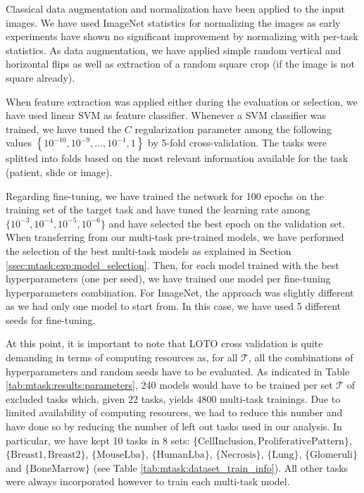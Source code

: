 Classical data augmentation and normalization have been applied to the input images. We have used ImageNet statistics for normalizing the images as early experiments have shown no significant improvement by normalizing with per-task statistics. As data augmentation, we have applied simple random vertical and horizontal flips as well as extraction of a random square crop (if the image is not square already).

When feature extraction was applied either during the evaluation or selection, we have used linear SVM \parencite{fan2008liblinear} as feature classifier. Whenever a SVM classifier was trained, we have tuned the $C$ regularization parameter among the following values $\left\{10^{-10}, 10^{-9},...,10^{-1},1\right\}$ by 5-fold cross-validation. The tasks were splitted into folds based on the most relevant information available for the task (patient, slide or image).

Regarding fine-tuning, we have trained the network for 100 epochs on the training set of the target task and have tuned the learning rate among $\{10^{-3}, 10^{-4}, 10^{-5}, 10^{-6}\}$ and have selected the best epoch on the validation set. When transferring from our multi-task pre-trained models, we have performed the selection of the best multi-task models as explained in Section \ref{ssec:mtask:exp:model_selection}. Then, for each model trained with the best hyperparameters (\ie one per seed), we have trained one model per fine-tuning hyperparameters combination. For ImageNet, the approach was slightly different as we had only one model to start from. In this case, we have used 5 different seeds for fine-tuning. 

At this point, it is important to note that LOTO cross validation is quite demanding in terms of computing resources as, for all $\mathcal{T}$, all the combinations of hyperparameters and random seeds have to be evaluated. As indicated in Table \ref{tab:mtask:results:parameters}, 240 models would have to be trained per set $\mathcal{T}$ of excluded tasks which, given 22 tasks, yields 4800 multi-task trainings. Due to limited availability of computing resources, we had to reduce this number and have done so by reducing the number of left out tasks used in our analysis. In particular, we have kept 10 tasks in 8 sets: $\{\text{CellInclusion}, \text{ProliferativePattern}\}$, $\{\text{Breast1}, \text{Breast2}\}$, $\{\text{MouseLba}\}$, $\{\text{HumanLba}\}$, $\{\text{Necrosis}\}$, $\{\text{Lung}\}$, $\{\text{Glomeruli}\}$ and $\{\text{BoneMarrow}\}$ (see Table \ref{tab:mtask:dataset_train_info}). All other tasks were always incorporated however to train each multi-task model.

